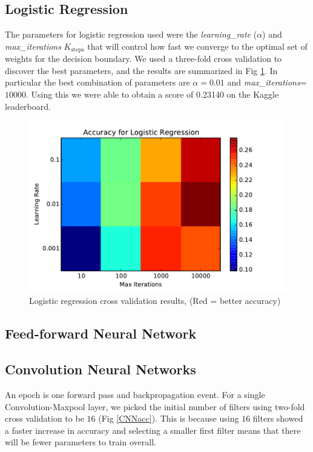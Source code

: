 \documentclass[conference]{IEEEtran}
\begin{document}
\subsection{Logistic Regression}
The parameters for logistic regression used were the \emph{learning\_rate} ($\alpha$) and \emph{max\_iterations} $K_{\text{steps}}$ that will control how fast we converge to the optimal set of weights for the decision boundary. We used a three-fold cross validation to discover the best parameters, and the results are summarized in Fig \ref{LR_accuracy}. In particular the best combination of parameters are $\alpha=0.01$ and \emph{max\_iterations}=$10000$. Using this we were able to obtain a score of 0.23140 on the Kaggle leaderboard.

\begin{figure}[h]
	\centering
	\includegraphics[scale=0.50]{LR_accuracy.pdf}
	\caption{Logistic regression cross validation results, (Red = better accuracy)}
	\label{LR_accuracy}
\end{figure}

\subsection{Feed-forward Neural Network}


\subsection{Convolution Neural Networks}
An epoch is one forward pass and backpropagation event. For a single Convolution-Maxpool layer, we picked the initial number of filters using two-fold cross validation to be $16$ (Fig \ref{CNNacc}). This is because using $16$ filters showed a faster increase in accuracy and selecting a smaller first filter means that there will be fewer parameters to train overall.
\end{document}
